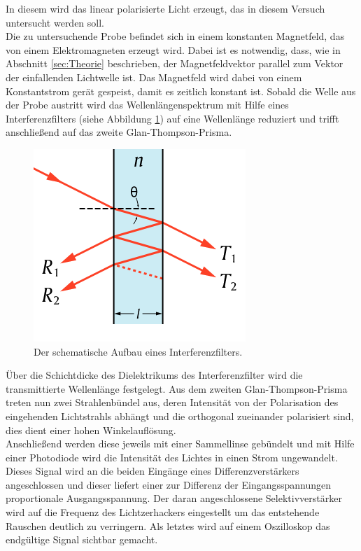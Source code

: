 In diesem wird das linear polarisierte Licht erzeugt, das in diesem Versuch untersucht werden soll.\\ Die zu untersuchende Probe befindet sich in einem konstanten Magnetfeld, das von einem Elektromagneten erzeugt wird.
Dabei ist es notwendig, dass, wie in Abschnitt
\ref{sec:Theorie} beschrieben, der Magnetfeldvektor parallel zum Vektor der einfallenden Lichtwelle ist. Das Magnetfeld wird dabei von einem Konstantstrom gerät gespeist, damit es zeitlich konstant ist. Sobald die Welle aus der Probe austritt wird das Wellenlängenspektrum mit Hilfe eines Interferenzfilters (siehe Abbildung \ref{fig:inter}) auf eine Wellenlänge reduziert und trifft anschließend auf das zweite Glan-Thompson-Prisma.
\begin{figure}[h!]
  \centering
  \includegraphics[scale=0.5]{fig/inter.png}
  \caption{Der schematische Aufbau eines Interferenzfilters. \cite{Anleitung4}}
  \label{fig:inter}
\end{figure}
Über die Schichtdicke des Dielektrikums des Interferenzfilter wird die transmittierte Wellenlänge festgelegt. Aus dem zweiten Glan-Thompson-Prisma treten nun zwei Strahlenbündel aus, deren
Intensität von der Polarisation des eingehenden Lichtstrahls abhängt und die orthogonal zueinander polarisiert sind, dies dient einer hohen Winkelauflösung.\\
Anschließend werden diese jeweils mit einer Sammellinse gebündelt und mit Hilfe einer Photodiode wird die Intensität des Lichtes in einen Strom ungewandelt. Dieses Signal wird an die beiden Eingänge eines
Differenzverstärkers angeschlossen und dieser liefert einer zur Differenz der Eingangsspannungen proportionale Ausgangsspannung. Der daran angeschlossene Selektivverstärker wird auf die Frequenz des Lichtzerhackers eingestellt um
das entstehende Rauschen deutlich zu verringern. Als letztes wird auf einem Oszilloskop das endgültige Signal sichtbar gemacht.

